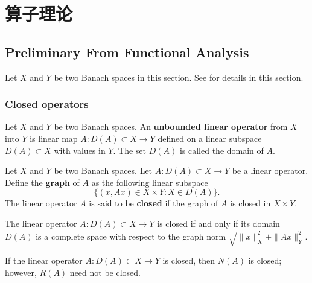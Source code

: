 \chapter{算子理论}



\section{Preliminary From Functional Analysis}


Let $X$ and $Y$ be two Banach spaces in this section. See \cite{Brezis2011, Weidmann1980} for details in this section.

\subsection{Closed operators}
\begin{defn}
Let $X$ and $Y$ be two Banach spaces. An {\bf unbounded linear operator} from
$X$ into $Y$ is linear map $A: D(A)\subset X\to Y$ defined on a linear subspace $D(A)\subset X$ with values in $Y$. The set $D(A)$ is called the domain of $A$.
\end{defn}

\begin{defn}[Graph]
Let $X$ and $Y$ be two Banach spaces. Let $A: D(A)\subset X\to Y$ be a linear operator.
Define the \textbf{graph} of $A$ as the following linear subspace
\[
\{(x, Ax)\in X\times Y: X\in D(A)\}.
\]
The linear operator $A$ is said to be \textbf{closed} if the graph of $A$ is closed in $X\times Y$.
\end{defn}

\begin{lemma}
The linear operator $A: D(A)\subset X\to Y$ is closed if and only if \textcolor[rgb]{1.00,0.00,0.00}{its domain $D(A)$ is a complete space with respect to the graph norm $\sqrt{\|x\|_X^2+\|Ax\|_{Y}^2}$}.
\end{lemma}

\begin{lemma}
If the linear operator $A: D(A)\subset X\to Y$ is closed, then \textcolor[rgb]{1.00,0.00,0.00}{$N(A)$ is closed; however, $R(A)$ need not be closed}.
\end{lemma}

